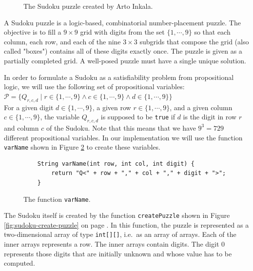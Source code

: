\begin{figure}[!ht]
  \centering
  \caption{The Sudoku puzzle created by Arto Inkala.}
  \label{fig:sudoku.png}
\end{figure}

A Sudoku puzzle is a logic-based, combinatorial number-placement puzzle. The objective is to fill a
$9 \times 9$ grid with digits from the set $\{1, \cdots, 9\}$ so that each column, each row, and each of the
nine $3 \times 3$ subgrids that compose the grid (also called "boxes") contains all of these digits exactly
once.  The puzzle is given as a partially completed grid.  A well-posed puzzle must have a single unique
solution.

In order to formulate a Sudoku as a satisfiability problem from propositional logic, we will use the following
set of propositional variables:
\\[0.2cm]
\hspace*{1.3cm}
$\mathcal{P} = \bigl\{ Q_{r,c,d} \mid r \in \{1,\cdots, 9\} \wedge c \in \{1,\cdots, 9\} \wedge d \in \{1,\cdots, 9\} \bigl\}$
\\[0.2cm]
For a given digit $d \in \{1, \cdots, 9\}$, a given row $r \in \{1, \cdots, 9\}$, and a given column
$c \in \{1, \cdots, 9\}$, the variable $Q_{r,c,d}$ is supposed to be \texttt{true} if $d$ is the digit in
row $r$ and column $c$ of the Sudoku.  Note that this means that we have $9^3 = 729$ different propositional
variables.  In our implementation we will use the function \texttt{varName} shown in
Figure \ref{fig:sudoku-var} to create these variables.

\begin{figure}[!ht]
\centering
\begin{verbatim}
    String varName(int row, int col, int digit) {
        return "Q<" + row + "," + col + "," + digit + ">";
    }
\end{verbatim}
\vspace*{-0.3cm}
\caption{The function \texttt{varName}.}
\label{fig:sudoku-var}
\end{figure} %

The Sudoku itself is created by the function \texttt{createPuzzle} shown in Figure
\ref{fig:sudoku-create-puzzle} on page \pageref{fig:sudoku-create-puzzle}.  In this function, the puzzle is
represented as a two-dimensional array of type \texttt{int[][]}, i.e.~as an array of arrays.  Each of the inner
arrays represents a row.  The inner arrays contain digits.  The digit $0$ represents those digits that are
initially unknown and whose value has to be computed.

